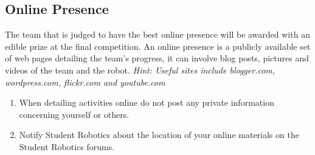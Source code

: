 \subsection{Online Presence}
The team that is judged to have the best online presence will be awarded with an edible prize at the final competition.
 An online presence is a publicly available set of web pages detailing the team's progress, it can involve blog posts, pictures and videos of the team and the robot.
 \emph{Hint: Useful sites include blogger.com, wordpress.com, flickr.com and youtube.com}
\begin{enumerate}
\item When detailing activities online do not post any private information concerning yourself or others.
\item Notify Student Robotics about the location of your online materials on the Student Robotics forums.
\end{enumerate}

